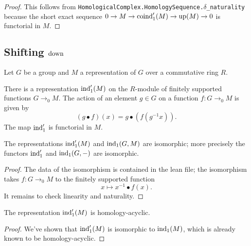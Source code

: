 \begin{proof}
	This follows from \texttt{HomologicalComplex.HomologySequence.$\delta$\_naturality}
	because the short exact sequence $0 \to M \to \mathrm{coind}_1'(M) \to \mathrm{up}(M) \to 0$
	is functorial in $M$.
\end{proof}

\subsection{Shifting $\mathrm{down}$}
Let $G$ be a group and $M$ a representation of $G$ over a commutative ring $R$.

\begin{definition} \label{def:ind₁'}
	There is a representation $\mathrm{ind}_1' (M)$ on the $R$-module of finitely supported
	functions $G \to_0 M$.
	The action of an element $g \in G$ on a function $f : G \to_0 M$ is given by
	\[
		(g \bullet f)(x) = g \bullet (f (g^{-1}x)).
	\]
	The map $\mathrm{ind}_1'$ is functorial in $M$.
\end{definition}

\begin{lemma}	\label{lem:ind₁' iso ind₁}
	\leanok
	The representations $\mathrm{ind}_1'(M)$ and $\mathrm{ind}_1(G,M)$ are isomorphic; more precisely the
	functors $\mathrm{ind}_1'$ and $\mathrm{ind}_1(G,-)$ are isomorphic.
\end{lemma}

\begin{proof}
	The data of the isomorphism is contained in the lean file; the isomorphism
	takes $f : G \to_0 M$ to the finitely supported function
	\[
		x \mapsto x^{-1} \bullet f(x).
	\]
	It remains to check linearity and naturality.
\end{proof}

\begin{corollary}	\label{cor:ind₁' homology-acyclic}
	\leanok
	The representation $\mathrm{ind}_1'(M)$ is homology-acyclic.
\end{corollary}

\begin{proof}
	\leanok
	We've shown that $\mathrm{ind}_1'(M)$ is isomorphic to $\mathrm{ind}_1(M)$, which is already known to
	be homology-acyclic.
\end{proof}


